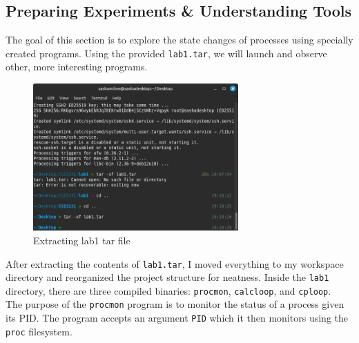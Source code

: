 \subsection{Preparing Experiments \& Understanding Tools}\label{subsec:preparing-experiments-&-understanding-tools}
The goal of this section is to explore the state changes of processes using specially created programs.
Using the provided \texttt{lab1.tar}, we will launch and observe other, more interesting programs.
\begin{figure}[H]
    \centering
    \includegraphics[width=0.7\textwidth]{../../screenshots/step6-tar}
    \caption{Extracting lab1 tar file}
    \label{fig:step6-extract-tar}
\end{figure}

\afterfloat
After extracting the contents of \texttt{lab1.tar},
I moved everything to my workspace directory and reorganized the
project structure for neatness.
Inside the \texttt{lab1} directory, there are three compiled binaries:
\texttt{procmon}, \texttt{calcloop}, and \texttt{cploop}.\\

\noindent
The purpose of the \texttt{procmon} program is to monitor the
status of a process given its PID\@.
The program accepts an argument \texttt{PID} which it then monitors
using the \texttt{proc} filesystem.\\

\noindent